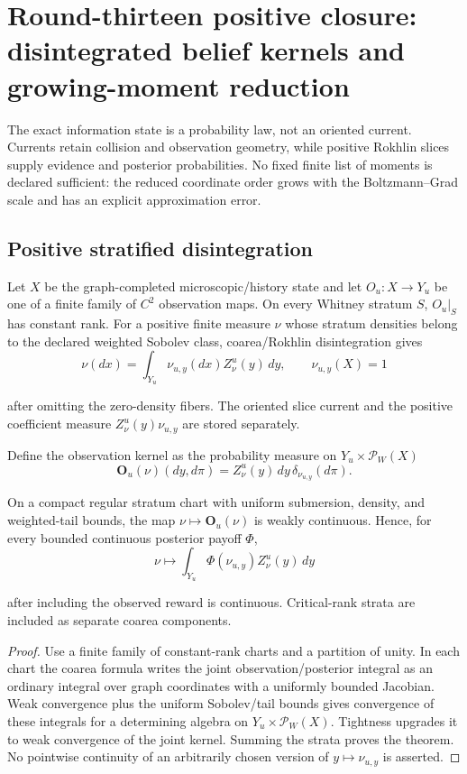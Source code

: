 \section{Round-thirteen positive closure: disintegrated belief kernels and growing-moment reduction}
\label{sec:r13-c1}

The exact information state is a probability law, not an oriented current.
Currents retain collision and observation geometry, while positive Rokhlin
slices supply evidence and posterior probabilities.  No fixed finite list of
moments is declared sufficient: the reduced coordinate order grows with the
Boltzmann--Grad scale and has an explicit approximation error.

\subsection{Positive stratified disintegration}

Let $X$ be the graph-completed microscopic/history state and let
$O_u:X\to Y_u$ be one of a finite family of $C^2$ observation maps.  On every
Whitney stratum $S$, $O_u|_S$ has constant rank.  For a positive finite measure
$\nu$ whose stratum densities belong to the declared weighted Sobolev class,
coarea/Rokhlin disintegration gives
\[
 \nu(dx)=\int_{Y_u}\nu_{u,y}(dx)Z_\nu^u(y)\,dy,
 \qquad
 \nu_{u,y}(X)=1
\]

after omitting the zero-density fibers.  The oriented slice current and the
positive coefficient measure $Z_\nu^u(y)\nu_{u,y}$ are stored separately.

Define the observation kernel as the probability measure on
$Y_u\times\mathcal P_W(X)$
\[
 \mathbf O_u(\nu)(dy,d\pi)
 =Z_\nu^u(y)\,dy\,\delta_{\nu_{u,y}}(d\pi).
\]

\begin{theorem}
\label{thm:r13-c1-feller}
On a compact regular stratum chart with uniform submersion, density, and
weighted-tail bounds, the map
$\nu\mapsto\mathbf O_u(\nu)$ is weakly continuous.  Hence, for every bounded
continuous posterior payoff $\Phi$,
\[
 \nu\longmapsto
 \int_{Y_u}\Phi(\nu_{u,y})Z_\nu^u(y)\,dy
\]

after including the observed reward is continuous.  Critical-rank strata are
included as separate coarea components.
\end{theorem}

\begin{proof}
Use a finite family of constant-rank charts and a partition of unity.  In each
chart the coarea formula writes the joint observation/posterior integral as an
ordinary integral over graph coordinates with a uniformly bounded Jacobian.
Weak convergence plus the uniform Sobolev/tail bounds gives convergence of
these integrals for a determining algebra on
$Y_u\times\mathcal P_W(X)$.  Tightness upgrades it to weak convergence of the
joint kernel.  Summing the strata proves the theorem.  No pointwise continuity
of an arbitrarily chosen version of $y\mapsto\nu_{u,y}$ is asserted.
\end{proof}

